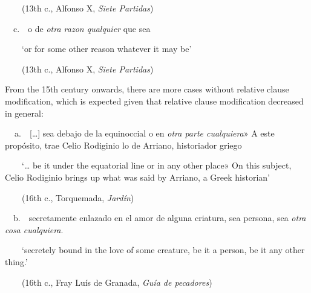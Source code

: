 \begin{styleStandard}
\ \ \ \ (13th c., Alfonso X, \textit{Siete Partidas})
\end{styleStandard}

\begin{styleStandard}
\ \ c.\ \ o de \textit{otra razon qualquier} que sea 
\end{styleStandard}

\begin{styleStandard}
\ \ \ \ ‘or for some other reason whatever it may be’
\end{styleStandard}

\begin{styleStandard}
\ \ \ \ (13th c., Alfonso X, \textit{Siete Partidas})
\end{styleStandard}

\begin{styleStandard}
From the 15th century onwards, there are more cases without relative clause modification, which is expected given that relative clause modification decreased in general:
\end{styleStandard}

\begin{styleStandard}
\textbf{\ \ }a.\ \ […] sea debajo de la equinoccial o en \textit{otra parte cualquiera}» A este propósito, trae Celio Rodiginio lo de Arriano, historiador griego 
\end{styleStandard}

\begin{styleStandard}
\ \ \ \ ‘… be it under the equatorial line or in any other place» On this subject, Celio Rodiginio brings up what was said by Arriano, a Greek historian’
\end{styleStandard}

\begin{styleStandard}
\ \ \ \ (16th c., Torquemada, \textit{Jardín})
\end{styleStandard}

\begin{styleStandard}
\ \ b.\ \ secretamente enlazado en el amor de alguna criatura, sea persona, sea \textit{otra cosa cualquiera}. 
\end{styleStandard}

\begin{styleStandard}
\ \ \ \ ‘secretely bound in the love of some creature, be it a person, be it any other thing.’
\end{styleStandard}

\begin{styleStandard}
\ \ \ \ (16th c., Fray Luís de Granada, \textit{Guía de pecadores})
\end{styleStandard}

